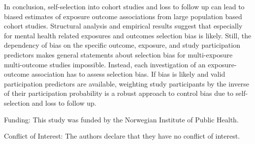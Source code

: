 \documentclass[12pt]{article}
\begin{document}
In conclusion, self-selection into cohort studies and loss to follow up can lead to biased estimates of exposure outcome associations from large population based cohort studies. Structural analysis and empirical results suggest that especially for mental health related exposures and outcomes selection bias is likely. Still, the dependency of bias on the specific outcome, exposure, and study participation predictors makes general statements about selection bias for multi-exposure multi-outcome studies impossible. Instead, each  investigation of an exposure-outcome association has to assess selection bias. If bias is likely and valid participation predictors are available, weighting study participants by the inverse of their participation probability is a robust approach to control bias due to self-selection and loss to follow up.


Funding: This study was funded by the Norwegian Institute of Public Health.


Conflict of Interest: The authors declare that they have no conflict of interest.


\newpage

\printbibliography

\newpage

\processdelayedfloats

\clearpage

\makeatletter
\efloat@restorefloats
\makeatother

\appendix

\renewcommand{\thefigure}{S\arabic{figure}}
\renewcommand{\thepostfigure}{S\arabic{postfigure}}
\setcounter{figure}{0}
\setcounter{postfigure}{0}

\renewcommand{\thetable}{S\arabic{table}}
\renewcommand{\theposttable}{S\arabic{posttable}}
\setcounter{table}{0}
\setcounter{posttable}{0}

\setcounter{page}{1}






\newpage


\begin{figure}[ht]
	\caption{}
	\label{fig:covariation}
\end{figure}

\begin{figure}[ht]
	\caption{}
	\label{fig:IPW}
\end{figure}

\begin{figure}[ht]
	\caption{} 
	\label{fig:logRRs}
\end{figure}

\begin{figure}[ht]
	\caption{}
	\label{fig:ropeplots}
\end{figure}
\end{document}
